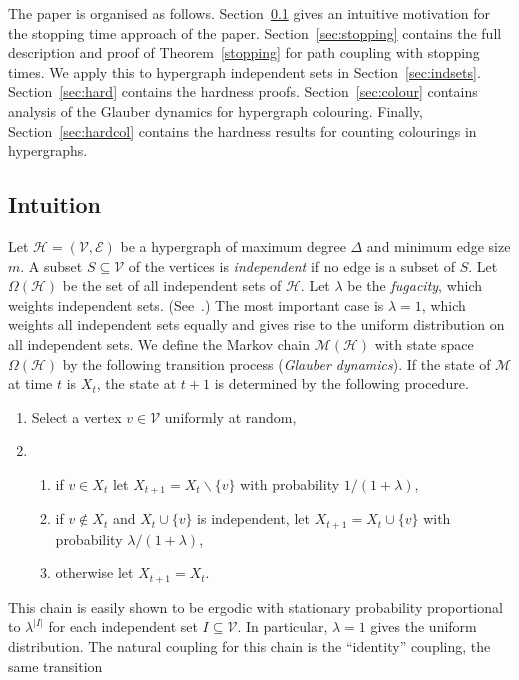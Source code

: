 \documentclass[11pt]{article}
\theoremstyle{definition}
\theoremstyle{remark}
\newcommand{\M}{\mathcal{M}}
\newcommand{\CE}{\mathcal{E}}
\newcommand{\CH}{\mathcal{H}}
\newcommand{\CV}{\mathcal{V}}
\begin{document}
The paper is organised as follows. Section~\ref{sec:intuit} gives an
intuitive motivation for the stopping time approach of the paper.
Section~\ref{sec:stopping} contains the full description and proof of
Theorem~\ref{stopping} for path coupling with stopping times. We apply this
to hypergraph independent sets in Section~\ref{sec:indsets}.
Section~\ref{sec:hard} contains the hardness proofs.
Section~\ref{sec:colour} contains analysis of the Glauber dynamics for
hypergraph colouring. Finally, Section~\ref{sec:hardcol} contains the
hardness results for counting colourings in hypergraphs.

\subsection{Intuition}\label{sec:intuit}
Let $\CH=(\CV,\CE)$ be a hypergraph of maximum degree $\Delta$ and minimum
edge size $m$. A subset $S\subseteq \CV$ of the vertices is
\emph{independent} if no edge is a subset of $S$. Let $\Omega(\CH)$ be the
set of all independent sets of $\CH$. Let $\lambda$ be the \emph{fugacity},
which weights independent sets. (See~\cite{DG00a}.) The most important case
is $\lambda=1$, which weights all independent sets equally and gives rise
to the uniform distribution on all independent sets. We define the Markov
chain $\M(\CH)$ with state space $\Omega(\CH)$ by the following transition
process (\emph{Glauber dynamics}). If the state of $\M$ at time $t$ is
$X_t$, the state at $t+1$ is determined by the following procedure.
\begin{enumerate}
\item Select a vertex $v\in \CV$ uniformly at random, \item
\begin{enumerate}
    \item if $v\in X_t$ let $X_{t+1}=X_t\backslash \{v\}$ with probability
    $1/(1+\lambda)$,
    \item if $v\not\in X_t$ and $X_t \cup \{v\} $ is independent, let
    $X_{t+1}=X_t\cup \{v\}$ with probability $\lambda/(1+\lambda)$,
    \item otherwise let $X_{t+1}=X_t$.
\end{enumerate}
\end{enumerate}
This chain is easily shown to be ergodic with stationary probability
proportional to $\lambda^{|I|}$ for each independent set $I\subseteq \CV$.
In particular, $\lambda=1$ gives the uniform distribution. The natural
coupling for this chain is the ``identity'' coupling, the same transition
\end{document}
